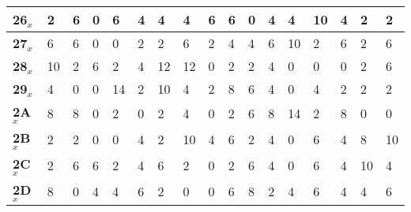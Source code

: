 \begin{longtable}[c]{|l|l|l|l|l|l|l|l|l|l|l|l|l|l|l|l|l|}
\textbf{26$_x$} & 2              & 6              & 0              & 6              & 4              & 4              & 4              & 6              & 6              & 0              & 4              & 4              & 10             & 4              & 2              & 2              \\ \hline
\textbf{27$_x$} & 6              & 6              & 0              & 0              & 2              & 2              & 6              & 2              & 4              & 4              & 6              & 10             & 2              & 6              & 2              & 6              \\ \hline
\textbf{28$_x$} & 10             & 2              & 6              & 2              & 4              & 12             & 12             & 0              & 2              & 2              & 4              & 0              & 0              & 0              & 2              & 6              \\ \hline
\textbf{29$_x$} & 4              & 0              & 0              & 14             & 2              & 10             & 4              & 2              & 8              & 6              & 4              & 0              & 4              & 2              & 2              & 2              \\ \hline
\textbf{2A$_x$} & 8              & 8              & 0              & 2              & 0              & 2              & 4              & 0              & 2              & 6              & 8              & 14             & 2              & 8              & 0              & 0              \\ \hline
\textbf{2B$_x$} & 2              & 2              & 0              & 0              & 4              & 2              & 10             & 4              & 6              & 2              & 4              & 0              & 6              & 4              & 8              & 10             \\ \hline
\textbf{2C$_x$} & 2              & 6              & 6              & 2              & 4              & 6              & 2              & 0              & 2              & 6              & 4              & 0              & 6              & 4              & 10             & 4              \\ \hline
\textbf{2D$_x$} & 8              & 0              & 4              & 4              & 6              & 2              & 0              & 0              & 6              & 8              & 2              & 4              & 6              & 4              & 4              & 6              \\ \hline

\end{longtable}
